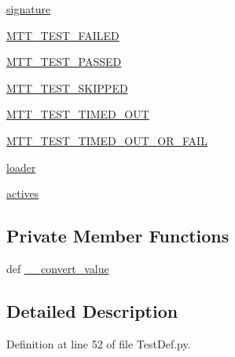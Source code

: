 \begin{DoxyCompactItemize}
\item 
\hyperlink{class_test_def_1_1_test_def_ab171a6f327589b31859a5b67a42dd21a}{signature}
\item 
\hyperlink{class_test_def_1_1_test_def_a47c6e8d1d927ec3c05ec7b8f1db538ee}{M\-T\-T\-\_\-\-T\-E\-S\-T\-\_\-\-F\-A\-I\-L\-E\-D}
\item 
\hyperlink{class_test_def_1_1_test_def_a142b9283c41740c727811f9c6cf9a6a4}{M\-T\-T\-\_\-\-T\-E\-S\-T\-\_\-\-P\-A\-S\-S\-E\-D}
\item 
\hyperlink{class_test_def_1_1_test_def_a698b11f71997b8ed2a35846faa183de4}{M\-T\-T\-\_\-\-T\-E\-S\-T\-\_\-\-S\-K\-I\-P\-P\-E\-D}
\item 
\hyperlink{class_test_def_1_1_test_def_a4e76ad80a0e033c9a5f25e9fd3381fd5}{M\-T\-T\-\_\-\-T\-E\-S\-T\-\_\-\-T\-I\-M\-E\-D\-\_\-\-O\-U\-T}
\item 
\hyperlink{class_test_def_1_1_test_def_a18b0aaa87484f9b5a22ad162755df7c6}{M\-T\-T\-\_\-\-T\-E\-S\-T\-\_\-\-T\-I\-M\-E\-D\-\_\-\-O\-U\-T\-\_\-\-O\-R\-\_\-\-F\-A\-I\-L}
\item 
\hyperlink{class_test_def_1_1_test_def_a07a19e8ffafc926b0732d466a837b13b}{loader}
\item 
\hyperlink{class_test_def_1_1_test_def_a1eb766274fa9869e6b04e612e6d169b0}{actives}
\end{DoxyCompactItemize}
\subsection*{Private Member Functions}
\begin{DoxyCompactItemize}
\item 
def \hyperlink{class_test_def_1_1_test_def_a2ed090ffdc5882b9855a22a6ec408185}{\-\_\-\-\_\-convert\-\_\-value}
\end{DoxyCompactItemize}


\subsection{Detailed Description}


Definition at line 52 of file Test\-Def.\-py.



